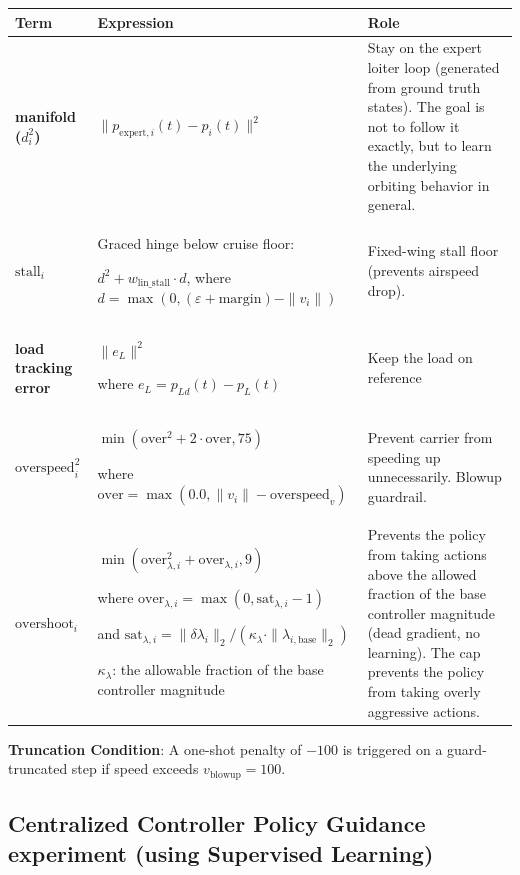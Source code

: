 \begin{longtable}{|p{}|p{}|p{}|}
\hline
\textbf{Term} & \textbf{Expression} & \textbf{Role} \\ \hline
\textbf{manifold ($d_i^2$)} & $\|p_{\text{expert},i}(t) - p_i(t)\|^2$ & Stay on the expert loiter loop (generated from ground truth states). The goal is not to follow it exactly, but to learn the underlying orbiting behavior in general. \\ \hline
\textbf{$\text{stall}_i$} & Graced hinge below cruise floor: \par $d^2 + w_{\text{lin\_stall}} \cdot d$, where $d = \max(0, (\varepsilon + \text{margin}) - \|v_i\|)$ & Fixed-wing stall floor (prevents airspeed drop). \\ \hline
\textbf{load tracking error} & $\|e_L\|^2$ \par where $e_L = p_{Ld}(t) - p_L(t)$ & Keep the load on reference \\ \hline
\textbf{$\text{overspeed}_i^2$} & $\min(\text{over}^2 + 2 \cdot \text{over}, 75)$ \par where $\text{over} = \max(0.0, \|v_i\| - \text{overspeed}_v)$ & Prevent carrier from speeding up unnecessarily. Blowup guardrail. \\ \hline
\textbf{$\text{overshoot}_i$} & $\min(\text{over}_{\lambda,i}^2 + \text{over}_{\lambda,i}, 9)$ \par where $\text{over}_{\lambda,i} = \max(0, \text{sat}_{\lambda,i} - 1)$ \par and $\text{sat}_{\lambda,i} = \|\delta\lambda_i\|_2 / (\kappa_\lambda \cdot \|\lambda_{i,\text{base}}\|_2)$ \par $\kappa_\lambda$: the allowable fraction of the base controller magnitude & Prevents the policy from taking actions above the allowed fraction of the base controller magnitude (dead gradient, no learning). The cap prevents the policy from taking overly aggressive actions. \\ \hline
\end{longtable}

\textbf{Truncation Condition}: A one-shot penalty of $-100$ is triggered
on a guard-truncated step if speed exceeds $v_{\text{blowup}} = 100$.

\subsection{Centralized Controller Policy Guidance experiment (using Supervised Learning)}

